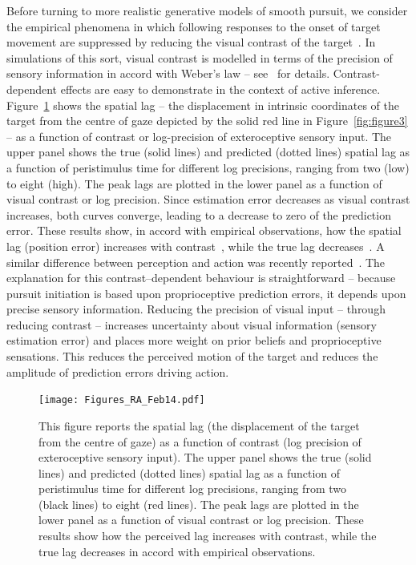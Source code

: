\documentclass[a4paper]{article} %
\begin{document}
Before turning to more realistic generative models of smooth pursuit, we
consider the empirical phenomena in which following responses to the
onset of target movement are suppressed by reducing the visual contrast
of the target~\citep{Thompson82}. In simulations of this sort, visual
contrast is modelled in terms of the precision of sensory information in
accord with Weber's law -- see~\citep{Feldman10a} for details.
Contrast-dependent effects are easy to demonstrate in the context of
active inference. Figure~\ref{fig:figure5} shows the spatial lag -- the displacement in
intrinsic coordinates of the target from the centre of gaze depicted by
the solid red line in Figure~\ref{fig:figure3} -- as a function of contrast or
log-precision of exteroceptive sensory input. The upper panel shows the
true (solid lines) and predicted (dotted lines) spatial lag as a
function of peristimulus time for different log precisions, ranging from
two (low) to eight (high). The peak lags are plotted in the lower panel
as a function of visual contrast or log precision. Since estimation
error decreases as visual contrast increases, both curves converge,
leading to a decrease to zero of the prediction error. These results
show, in accord with empirical observations, how the spatial lag
(position error) increases with contrast~\citep{Arnold09}, while the
true lag decreases~\citep{Spering05}. A similar difference between perception and action was recently reported~\citep{Simoncini12}. The explanation for this
contrast--dependent behaviour is straightforward -- because pursuit
initiation is based upon proprioceptive prediction errors, it depends
upon precise sensory information. Reducing the precision of visual input
-- through reducing contrast -- increases uncertainty about visual
information (sensory estimation error) and places more weight on prior
beliefs and proprioceptive sensations. This reduces the perceived motion
of the target and reduces the amplitude of prediction errors driving
action.

\begin{figure}%
 \centerline{%
 \texttt{[image: Figures\_RA\_Feb14.pdf]} %
}%
\caption{ This figure reports the spatial lag (the displacement
of the target from the centre of gaze) as a function of contrast (log
precision of exteroceptive sensory input). The upper panel shows the
true (solid lines) and predicted (dotted lines) spatial lag as a
function of peristimulus time for different log precisions, ranging from
two (black lines) to eight (red lines). The peak lags are plotted in the
lower panel as a function of visual contrast or log precision. These
results show how the perceived lag increases with contrast, while the
true lag decreases in accord with empirical observations.}%
\label{fig:figure5}
\end{figure}
\end{document}
